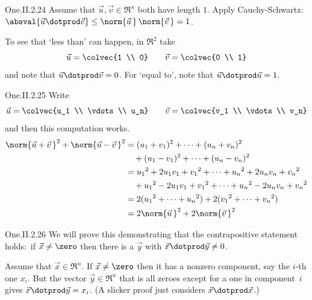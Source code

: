\begin{ans}{One.II.2.24}
      Assume that \( \vec{u},\vec{v}\in\Re^n \) both have length \( 1 \).
      Apply Cauchy-Schwartz:
      $\absval{\vec{u}\dotprod\vec{v}}
             \leq\norm{\vec{u}\,}\,\norm{\vec{v}\,}=1$.

      To see that `less than' can happen, in \( \Re^2 \) take
      \begin{equation*}
        \vec{u}=\colvec{1 \\ 0}
        \qquad
        \vec{v}=\colvec{0 \\ 1}
      \end{equation*}
      and note that \( \vec{u}\dotprod\vec{v}=0 \).
      For `equal to', note that \( \vec{u}\dotprod\vec{u}=1 \).
    
\end{ans}
\begin{ans}{One.II.2.25}
      Write
      \begin{equation*}
        \vec{u}=\colvec{u_1 \\ \vdots \\ u_n}
        \qquad
        \vec{v}=\colvec{v_1 \\ \vdots \\ v_n}
      \end{equation*}
      and then this computation works.
      \begin{align*}
        \norm{\vec{u}+\vec{v}\,}^2+\norm{\vec{u}-\vec{v}\,}^2
        &=(u_1+v_1)^2+\cdots+(u_n+v_n)^2   \\
        &\quad +(u_1-v_1)^2+\cdots+(u_n-v_n)^2     \\
        &={u_1}^2+2u_1v_1+{v_1}^2+\cdots+{u_n}^2+2u_nv_n+{v_n}^2       \\
        &\quad +{u_1}^2-2u_1v_1+{v_1}^2+\cdots+{u_n}^2-2u_nv_n+{v_n}^2 \\
        &=2({u_1}^2+\cdots+{u_n}^2)+2({v_1}^2+\cdots+{v_n}^2) \\
        &=2\norm{\vec{u}\,}^2+2\norm{\vec{v}\,}^2
     \end{align*}
    
\end{ans}
\begin{ans}{One.II.2.26}
      We will prove this demonstrating that the contrapositive
      statement holds:~if \( \vec{x}\neq\zero \) then there
      is a \( \vec{y} \) with \( \vec{x}\dotprod\vec{y}\neq 0 \).

      Assume that \( \vec{x}\in\Re^n \).
      If \( \vec{x}\neq\zero \) then it has a nonzero component, say the
      \( i \)-th one \( x_i \).
      But the vector \( \vec{y}\in\Re^n \) that is all zeroes except for
      a one in component~$i$ gives
      \( \vec{x}\dotprod\vec{y}=x_i \).
      (A slicker proof just considers $\vec{x}\dotprod\vec{x}$.)
    
\end{ans}
